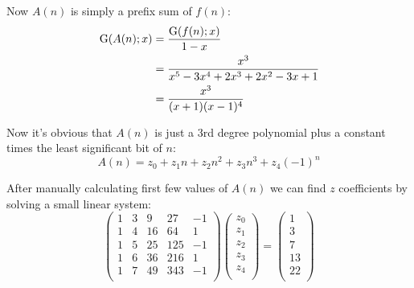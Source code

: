 \documentclass{article}
\begin{document}
Now $A(n)$ is simply a prefix sum of $f(n)$:
\begin{equation}
\begin{split}
	\mathrm{G}(A(n); x) & = \frac{\mathrm{G}(f(n); x)}{1 - x} \\
	            & = \frac{x^3}{x^5 - 3x^4 +2x^3 +2x^2 -3x + 1} \\
	            & = \frac{x^3}{(x+1)(x-1)^4}
\end{split}
\end{equation}

Now it's obvious that $A(n)$ is just a 3rd degree polynomial plus a constant times the least significant bit of $n$:
\begin{equation}
A(n) = z_0 + z_1n + z_2n^2 + z_3n^3 + z_4(-1)^n
\end{equation}

After manually calculating first few values of $A(n)$ we can find $z$ coefficients by solving a small linear system:
\begin{equation}
\begin{pmatrix}
 1 & 3 &  9 & 27  & -1 \\
 1 & 4 & 16 & 64  &  1 \\
 1 & 5 & 25 & 125 & -1 \\
 1 & 6 & 36 & 216 &  1 \\
 1 & 7 & 49 & 343 & -1 \\
\end{pmatrix}
\begin{pmatrix}
	z_0 \\
	z_1 \\
	z_2 \\
	z_3 \\
	z_4 \\
\end{pmatrix}
	=
\begin{pmatrix}
	1 \\
	3 \\
	7 \\
	13 \\
	22 \\
\end{pmatrix}
\end{equation}
\end{document}
